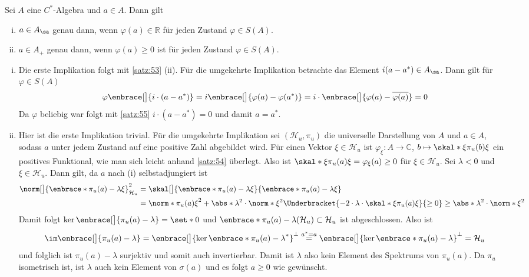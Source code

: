 \begin{korollar}[{name=[selbstadjungiert und positiv mittels Zuständen]},label=korr:514]
	Sei $A$ eine $C^*$-Algebra und $a \in A$.
	Dann gilt
	\begin{enumerate}[(i),itemsep=0pt]
		\item $a \in A_{\sa}$ genau dann, wenn $\varphi(a) \in \mathbb{R}$ für jeden Zustand $\varphi \in S(A)$.
		\item $a \in A_+$ genau dann, wenn $\varphi(a) \ge 0$ ist für jeden Zustand $\varphi \in S(A)$.
	\end{enumerate}
\end{korollar}
\begin{beweis}
	\leavevmode
	\begin{enumerate}[(i)]
		\item Die erste Implikation folgt mit \autoref{satz:53} (ii).
		Für die umgekehrte Implikation betrachte das Element $i(a-a^*) \in A_{\sa}$. Dann gilt für $\varphi \in S(A)$
		\[
			\varphi \enbrace[\big]{i \cdot (a- a^*)} = i \enbrace[\big]{\varphi(a) - \varphi(a^*)} = i \cdot  \enbrace[\big]{\varphi(a) - \overline{\varphi(a)}} =0
		\]
		Da $\varphi$ beliebig war folgt mit \autoref{satz:55} $i \cdot (a-a^*)=0$ und damit $a=a^*$.
		\item Hier ist die erste Implikation trivial. 
		Für die umgekehrte Implikation sei $(\mathcal{H}_u,\pi_u)$ die universelle Darstellung von $A$ und $a \in A$, sodass $a$ unter jedem Zustand auf eine positive Zahl abgebildet wird. 
		Für einen Vektor $\xi \in \mathcal{H}_u$ ist $\varphi_\xi \colon A \to \mathbb{C}$, $b \mapsto \skal*{\xi}{\pi_u(b)\xi}$ ein positives Funktional, wie man sich leicht anhand \autoref{satz:54} überlegt.
		Also ist $\skal*{\xi}{\pi_u(a)\xi}=  \varphi_\xi(a)\ge 0$ für $\xi \in \mathcal{H}_u$.
		Sei $\lambda<0$ und $\xi\in \mathcal{H}_u$.
		Dann gilt, da $a$ nach (i) selbstadjungiert ist
		\begin{align}
			\norm[\big]{\enbrace*{\pi_u(a)-\lambda} \xi}^2_{\mathcal{H}_u} &= \skal[\big]{\enbrace*{\pi_u(a)-\lambda}\xi}{ \enbrace*{\pi_u(a)-\lambda}\xi} \\
			&= \norm*{\pi_u(a)\xi}^2 + \abs*{\lambda}^2 \cdot \norm*{\xi}^2 \Underbracket{- 2 \cdot \lambda \cdot \skal*{\xi}{\pi_u(a)\xi}}{\ge 0} \ge \abs*{\lambda}^2 \cdot \norm*{\xi}^2 
		\end{align}
		Damit folgt $\ker \enbrace[\big]{\pi_u(a)-\lambda}= \set*{0}$ und $\enbrace*{\pi_u(a)-\lambda}(\mathcal{H}_u) \subset \mathcal{H}_u$ ist abgeschlossen.
		Also ist 
		\[
			\im \enbrace[\big]{\pi_u(a)-\lambda} = \enbrace[\big]{\ker \enbrace*{\pi_u(a)-\lambda}^*}^\bot \stackrel{a^*=a}{=} \enbrace[\big]{\ker \enbrace*{\pi_u(a)-\lambda}}^\bot = \mathcal{H}_u
		\]
		und folglich ist $\pi_u(a)-\lambda$ surjektiv und somit auch invertierbar.  
		Damit ist $\lambda$ also kein Element des Spektrums von $\pi_u(a)$. 
		Da $\pi_u$ isometrisch ist, ist $\lambda$ auch kein Element von $\sigma(a)$ und es folgt $a \ge 0$ wie gewünscht.\qedhere
	\end{enumerate}
\end{beweis}

